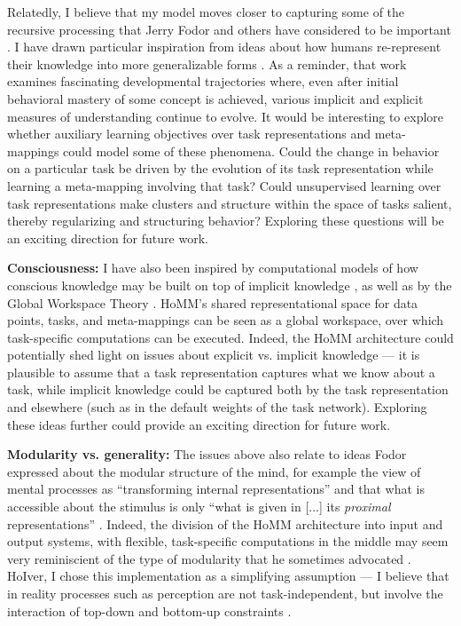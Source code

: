 Relatedly, I believe that my model moves closer to capturing some of the recursive processing that Jerry Fodor and others have considered to be important \citep[e.g.][]{Fodor2008lot2}. I have drawn particular inspiration from ideas about how humans re-represent their knowledge into more generalizable forms \citep{Karmiloff-Smith1986,Clark1993}. As a reminder, that work examines fascinating developmental trajectories where, even after initial behavioral mastery of some concept is achieved, various implicit and explicit measures of understanding continue to evolve. It would be interesting to explore whether auxiliary learning objectives over task representations and meta-mappings could model some of these phenomena. Could the change in behavior on a particular task be driven by the evolution of its task representation while learning a meta-mapping involving that task? Could unsupervised learning over task representations make clusters and structure within the space of tasks salient, thereby regularizing and structuring behavior? Exploring these questions will be an exciting direction for future work. \par 

\textbf{Consciousness:} I have also been inspired by computational models of how conscious knowledge may be built on top of implicit knowledge \citep{Cleeremans2014}, as well as by the Global Workspace Theory \citep{Baars2005}. HoMM's shared representational space for data points, tasks, and meta-mappings can be seen as a global workspace, over which task-specific computations can be executed. Indeed, the HoMM architecture could potentially shed light on issues about explicit vs. implicit knowledge --- it is plausible to assume that a task representation captures what we know about a task, while implicit knowledge could be captured both by the task representation and elsewhere (such as in the default weights of the task network). Exploring these ideas further could provide an exciting direction for future work. \par

\textbf{Modularity vs. generality:} The issues above also relate to ideas Fodor expressed about the modular structure of the mind, for example the view of mental processes as ``transforming internal representations'' and that what is accessible about the stimulus is only ``what is given in [...] its \emph{proximal} representations'' \citep[][pp. 200-201]{fodor1975language}. Indeed, the division of the HoMM architecture into input and output systems, with flexible, task-specific computations in the middle may seem very reminiscient of the type of modularity that he sometimes advocated \citep{Fodor1983modularity}. HoIver, I chose this implementation as a simplifying assumption --- I believe that in reality processes such as perception are not task-independent, but involve the interaction of top-down and bottom-up constraints \citep{McClelland2014}. \par

